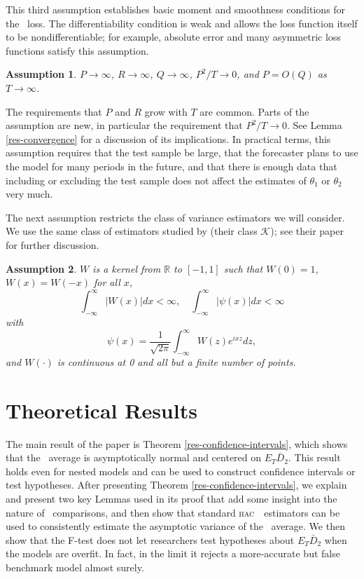 \documentclass[11pt]{article}
\newtheorem{asmp}{Assumption}
\newcommand{\hac}{\textsc{hac}}
\renewcommand{\Re}{\ensuremath{\mathbb{R}}}
\begin{document}
This third assumption establishes basic moment and smoothness
conditions for the \oos\ loss.  The differentiability
condition is weak and allows the loss function itself to be
nondifferentiable; for example, absolute error and many asymmetric loss functions
satisfy this assumption.

\begin{asmp} \label{asmp-4} $P\to\infty$,
  $R\to\infty$, $Q\to\infty$, $P^2/T \to 0$, and $P = O(Q)$ as $T \to \infty$.
\end{asmp}

The requirements that $P$ and $R$ grow with $T$ are common.  Parts of
the assumption are new, in particular the requirement that $P^2/T \to
0$.  See Lemma \ref{res-convergence} for a discussion of its
implications.  In practical terms, this assumption requires that the
test sample be large, that the forecaster plans to use the model for
many periods in the future, and that there is enough data that
including or excluding the test sample does not affect the estimates
of $\theta_1$ or $\theta_2$ very much.

The next assumption restricts the class of variance estimators we will
consider.  We use the same class of estimators studied by
\citet{de_jong_consistency_2000} (their class $\mathcal{K}$); see
their paper for further discussion.

\begin{asmp}
  \label{asmp-5} $W$ is a kernel from 
$\Re$ to $[-1,1]$ such that $W(0) = 1$, $W(x) = W(-x)$ for all $x$,
\begin{equation*}
    \int_{-\infty}^{\infty} \lvert W(x) \rvert dx < \infty, \quad
    \int_{-\infty}^{\infty} \lvert \psi(x) \rvert dx < \infty
\end{equation*}
with
\begin{equation*} \psi(x) = \frac1{\sqrt{2\pi}} \int_{-\infty}^{\infty} W(z) e^{ixz}dz,
\end{equation*}
and $W(\cdot)$ is continuous at 0 and all but a finite number of
points.
\end{asmp}

\section{Theoretical Results}\label{sec:theory}
The main result of the paper is Theorem
\ref{res-confidence-intervals}, which shows that the \oos\ average is
asymptotically normal and centered on $E_T \bar D_2$.  This result
holds even for nested models and can be used to construct confidence
intervals or test hypotheses.  After presenting Theorem
\ref{res-confidence-intervals}, we explain and present two key Lemmas
used in its proof that add some insight into the nature of \oos\
comparisons, and then show that standard \hac\ \oos\ estimators can be
used to consistently estimate the asymptotic variance of the \oos\
average.  We then show that the F-test does not let researchers test
hypotheses about $E_{T} \bar D_2$ when the models are overfit.  In
fact, in the limit it rejects a more-accurate but false benchmark
model almost surely.
\end{document}
